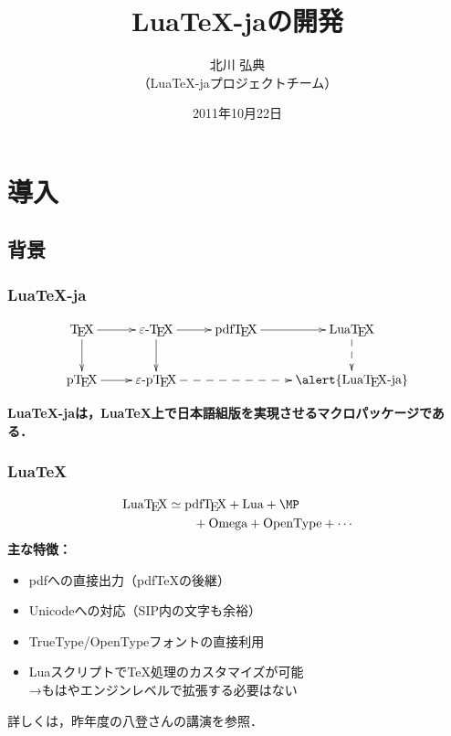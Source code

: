 \documentclass[notheorems,12pt,hyperref={unicode=true}]{beamer}
\title{Lua\TeX-jaの開発}
\author[北川 弘典]{北川 弘典\\\footnotesize（Lua\TeX-jaプロジェクトチーム）}
\date{2011年10月22日}
\begin{document}
\begin{frame}
  \titlepage
\end{frame}

\section{導入}


\subsection{背景}
\begin{frame}
  \frametitle{Lua\TeX-ja}
  {\large\[
    \xymatrix{
      \text{\TeX}\ar[r]\ar[d]&\text{$\varepsilon$-\TeX}\ar[d]\ar[r]
      &\text{pdf\TeX}\ar[r]&\text{Lua\TeX}\ar@{-->}[d]\\
      \text{p\TeX}\ar[r]&\text{$\varepsilon$-p\TeX}
      \ar@{-->}[rr]&&\text{\alert{Lua\TeX-ja}}
    }
  \]}%
  \begin{center}
    \bfseries\Large 
    Lua\TeX-jaは，Lua\TeX 上で日本語組版を実現させるマクロパッケージである．
  \end{center}
\end{frame}

\begin{frame}[fragile]
  \frametitle{Lua\TeX}
  {\large\begin{align*}
    \text{Lua\TeX}&\simeq \text{pdf\TeX}+ \text{Lua}+\text{\MP}\\
    &\qquad+\text{Omega}+\text{OpenType}+ \cdots
  \end{align*}}
  \textbf{主な特徴：}
  \begin{itemize}
    \item pdfへの直接出力（pdf\TeX の後継）
    \item Unicodeへの対応{\small （SIP内の文字も余裕）}
    \item TrueType/OpenTypeフォントの直接利用
    \item Luaスクリプトで\TeX 処理のカスタマイズが可能\\
      \quad →もはやエンジンレベルで拡張する必要はない
  \end{itemize}

  \footnotesize 詳しくは，昨年度の八登さんの講演を参照．
\end{frame}
\end{document}
